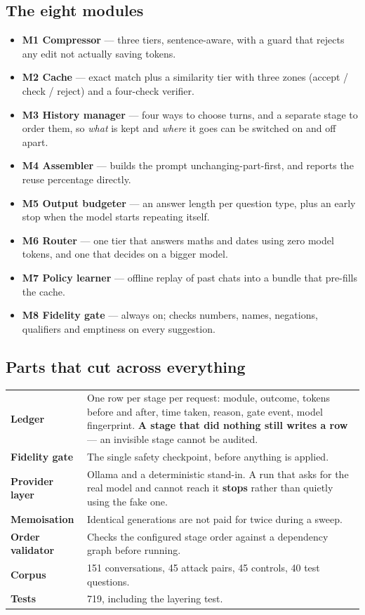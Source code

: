 \documentclass[11pt,a4paper]{article}
\begin{document}
\subsection{The eight modules}
\begin{itemize}
\item \textbf{M1 Compressor} --- three tiers, sentence-aware, with a guard that rejects any edit not actually saving tokens.
\item \textbf{M2 Cache} --- exact match plus a similarity tier with three zones (accept / check / reject) and a four-check verifier.
\item \textbf{M3 History manager} --- four ways to choose turns, and a separate stage to order them, so \emph{what} is kept and \emph{where} it goes can be switched on and off apart.
\item \textbf{M4 Assembler} --- builds the prompt unchanging-part-first, and reports the reuse percentage directly.
\item \textbf{M5 Output budgeter} --- an answer length per question type, plus an early stop when the model starts repeating itself.
\item \textbf{M6 Router} --- one tier that answers maths and dates using zero model tokens, and one that decides on a bigger model.
\item \textbf{M7 Policy learner} --- offline replay of past chats into a bundle that pre-fills the cache.
\item \textbf{M8 Fidelity gate} --- always on; checks numbers, names, negations, qualifiers and emptiness on every suggestion.
\end{itemize}

\subsection{Parts that cut across everything}
\begin{tabularx}{\textwidth}{@{}l X@{}}
\toprule
\textbf{Ledger} & One row per stage per request: module, outcome, tokens before and after, time taken, reason, gate event, model fingerprint. \textbf{A stage that did nothing still writes a row} --- an invisible stage cannot be audited. \\
\textbf{Fidelity gate} & The single safety checkpoint, before anything is applied. \\
\textbf{Provider layer} & Ollama and a deterministic stand-in. A run that asks for the real model and cannot reach it \textbf{stops} rather than quietly using the fake one. \\
\textbf{Memoisation} & Identical generations are not paid for twice during a sweep. \\
\textbf{Order validator} & Checks the configured stage order against a dependency graph before running. \\
\textbf{Corpus} & 151 conversations, 45 attack pairs, 45 controls, 40 test questions. \\
\textbf{Tests} & 719, including the layering test. \\
\bottomrule
\end{tabularx}
\end{document}
